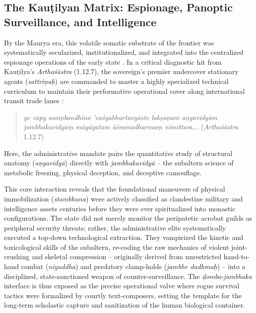 \documentclass[11pt,twoside,letterpaper]{article}
\begin{document}
\subsection{The Kau\d{t}ilyan Matrix: Espionage, Panoptic Surveillance, and Intelligence}
By the Maurya era, this volatile somatic substrate of the frontier was systematically secularized, institutionalized, and integrated into the centralized espionage operations of the early state \citep{Kangle1969}. In a critical diagnostic hit from Kau\d{t}ilya’s \textit{Artha\'s\={a}stra} (1.12.7), the sovereign’s premier undercover stationary agents (\textit{sattri\d{n}a\d{h}}) are commanded to master a highly specialized technical curriculum to maintain their performative operational cover along international transit trade lanes \citep{Kangle1969}:
\begin{quote}
\textit{ye c\={a}py asa\d{m}bandhino ’va\'syabhartavy\={a}ste lak\d{s}a\d{n}am a\d{n}gavidy\={a}m jambhakavidy\={a}\d{m} m\={a}y\={a}gatam \={a}\'sramadharma\d{m} nimittam...} (\textit{Artha\'s\={a}stra} 1.12.7)
\end{quote}
Here, the administrative mandate pairs the quantitative study of structural anatomy (\textit{a\d{n}gavidy\={a}}) directly with \textit{jambhakavidy\={a}} – the subaltern science of metabolic freezing, physical deception, and deceptive camouflage.

This core interaction reveals that the foundational maneuvers of physical immobilization (\textit{stambhana}) were actively classified as clandestine military and intelligence assets centuries before they were ever spiritualized into monastic configurations. The state did not merely monitor the peripatetic acrobat guilds as peripheral security threats; rather, the administrative elite systematically executed a top-down technological extraction. They vampirized the kinetic and toxicological skills of the subaltern, re-coding the raw mechanics of violent joint-crushing and skeletal compression – originally derived from unrestricted hand-to-hand combat (\textit{niyuddha}) and predatory clamp-holds (\textit{jambhe dadhma\d{h}}) – into a disciplined, state-sanctioned weapon of counter-surveillance. The \textit{\d{d}omba-jambhaka} interface is thus exposed as the precise operational valve where rogue survival tactics were formalized by courtly text-composers, setting the template for the long-term scholastic capture and sanitization of the human biological container.
\end{document}
